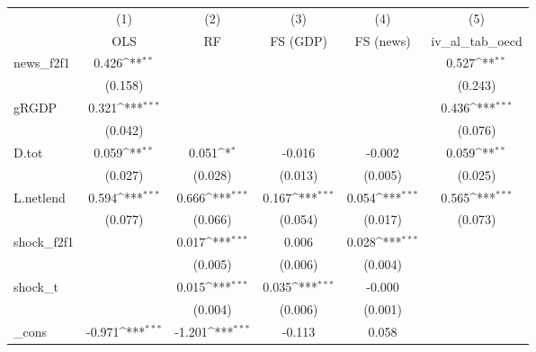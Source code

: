 {
\def\sym#1{\ifmmode^{#1}\else\(^{#1}\)\fi}
\begin{tabular}{l*{5}{c}}
\toprule
            &\multicolumn{1}{c}{(1)}&\multicolumn{1}{c}{(2)}&\multicolumn{1}{c}{(3)}&\multicolumn{1}{c}{(4)}&\multicolumn{1}{c}{(5)}\\
            &\multicolumn{1}{c}{OLS}&\multicolumn{1}{c}{RF}&\multicolumn{1}{c}{FS (GDP)}&\multicolumn{1}{c}{FS (news)}&\multicolumn{1}{c}{iv\_al\_tab\_oecd}\\
\midrule
news\_f2f1   &       0.426\sym{**} &                     &                     &                     &       0.527\sym{**} \\
            &     (0.158)         &                     &                     &                     &     (0.243)         \\
\addlinespace
gRGDP       &       0.321\sym{***}&                     &                     &                     &       0.436\sym{***}\\
            &     (0.042)         &                     &                     &                     &     (0.076)         \\
\addlinespace
D.tot       &       0.059\sym{**} &       0.051\sym{*}  &      -0.016         &      -0.002         &       0.059\sym{**} \\
            &     (0.027)         &     (0.028)         &     (0.013)         &     (0.005)         &     (0.025)         \\
\addlinespace
L.netlend   &       0.594\sym{***}&       0.666\sym{***}&       0.167\sym{***}&       0.054\sym{***}&       0.565\sym{***}\\
            &     (0.077)         &     (0.066)         &     (0.054)         &     (0.017)         &     (0.073)         \\
\addlinespace
shock\_f2f1  &                     &       0.017\sym{***}&       0.006         &       0.028\sym{***}&                     \\
            &                     &     (0.005)         &     (0.006)         &     (0.004)         &                     \\
\addlinespace
shock\_t     &                     &       0.015\sym{***}&       0.035\sym{***}&      -0.000         &                     \\
            &                     &     (0.004)         &     (0.006)         &     (0.001)         &                     \\
\addlinespace
\_cons      &      -0.971\sym{***}&      -1.201\sym{***}&      -0.113         &       0.058         &                     \\

\end{tabular}}

